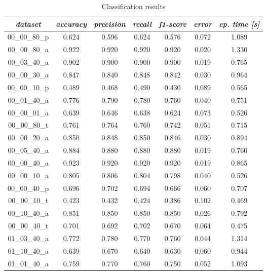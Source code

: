 \begin{table}[H]
\centering
\caption{Classification results}
\label{tab:classification_results}
\resizebox{\textwidth}{!} {
\begin{tabular}{|c|c|c|c|c|c|c|}
\hline
\textit{dataset} & \textit{accuracy} & \textit{precision} & \textit{recall} & \textit{f1-score} & \textit{error} & \textit{ep. time {[}s{]}} \\
\hline
00\_00\_80\_p 	& 0.624 	& 0.596 	& 0.624 	& 0.576 	& 0.072 	& 1.089 	 \\ \hline
00\_00\_80\_a 	& 0.922 	& 0.920 	& 0.920		& 0.920 	& 0.020 	& 1.330 	 \\ \hline
00\_03\_40\_a 	& 0.902 	& 0.900 	& 0.900 	& 0.900 	& 0.019 	& 0.765 	 \\ \hline
00\_00\_30\_a 	& 0.847 	& 0.840 	& 0.848 	& 0.842 	& 0.030 	& 0.964 	 \\ \hline
00\_00\_10\_p 	& 0.489 	& 0.468 	& 0.490 	& 0.430 	& 0.089 	& 0.565 	 \\ \hline
00\_01\_40\_a 	& 0.776 	& 0.790 	& 0.780 	& 0.760 	& 0.040 	& 0.751 	 \\ \hline
00\_00\_01\_a 	& 0.639 	& 0.646 	& 0.638 	& 0.624 	& 0.073 	& 0.526 	 \\ \hline
00\_00\_80\_t	& 0.761 	& 0.764 	& 0.760 	& 0.742 	& 0.051 	& 0.715 	 \\ \hline
00\_00\_20\_a 	& 0.850 	& 0.848 	& 0.850 	& 0.846 	& 0.030 	& 0.894 	 \\ \hline
00\_05\_40\_a 	& 0.884 	& 0.880 	& 0.880 	& 0.880 	& 0.019 	& 0.760 	 \\ \hline
00\_00\_40\_a 	& 0.923 	& 0.920 	& 0.920 	& 0.920 	& 0.019 	& 0.865 	 \\ \hline
00\_00\_10\_a 	& 0.805 	& 0.806 	& 0.804 	& 0.798 	& 0.040 	& 0.526 	 \\ \hline
00\_00\_40\_p 	& 0.696 	& 0.702 	& 0.694 	& 0.666 	& 0.060 	& 0.707 	 \\ \hline
00\_00\_10\_t 	& 0.423 	& 0.432 	& 0.424 	& 0.386 	& 0.102 	& 0.469 	 \\ \hline
00\_10\_40\_a 	& 0.851 	& 0.850 	& 0.850 	& 0.850 	& 0.026 	& 0.792 	 \\ \hline
00\_00\_40\_t	& 0.701 	& 0.692 	& 0.702 	& 0.670 	& 0.064 	& 0.475 	 \\ \hline
01\_03\_40\_a 	& 0.772 	& 0.780 	& 0.770 	& 0.760 	& 0.044 	& 1.314 	 \\ \hline
01\_10\_40\_a 	& 0.639 	& 0.670 	& 0.640 	& 0.630 	& 0.060 	& 0.944 	 \\ \hline
01\_01\_40\_a 	& 0.759 	& 0.770 	& 0.760 	& 0.750 	& 0.052 	& 1.093 	 \\ \hline

\end{tabular}}
\end{table}
